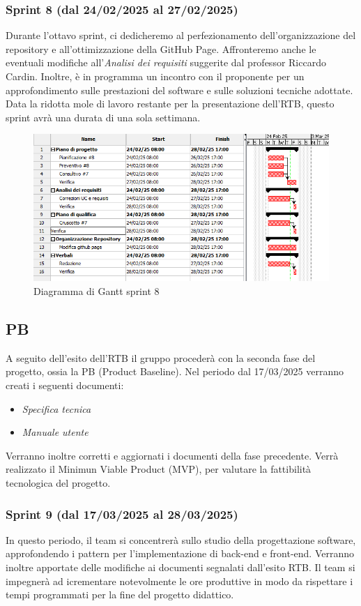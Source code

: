 \subsubsection{Sprint 8 (dal 24/02/2025 al 27/02/2025)}
Durante l'ottavo sprint, ci dedicheremo al perfezionamento dell'organizzazione del repository e all'ottimizzazione della GitHub Page.
Affronteremo anche le eventuali modifiche all'\textit{Analisi dei requisiti} suggerite dal professor Riccardo Cardin.
Inoltre, è in programma un incontro con il proponente per un approfondimento sulle prestazioni del software e sulle soluzioni tecniche adottate.
Data la ridotta mole di lavoro restante per la presentazione dell'RTB, questo sprint avrà una durata di una sola settimana.

\begin{figure}[h!]
    \centering
    \includegraphics[scale = 0.7]{template/images/gantt8.png}
    \caption{Diagramma di Gantt sprint 8}
    \label{fig:3.8} %
\end{figure}

\subsection{PB}
A seguito dell'esito dell'RTB il gruppo procederà con la seconda fase del progetto, ossia la PB (Product Baseline).
Nel periodo dal 17/03/2025 verranno creati i seguenti documenti:
\begin{itemize}
    \item \textit{Specifica tecnica}
    \item \textit{Manuale utente}
\end{itemize}
Verranno inoltre corretti e aggiornati i documenti della fase precedente.
Verrà realizzato il Minimun Viable Product (MVP), per valutare la fattibilità tecnologica del progetto.

\subsubsection{Sprint 9 (dal 17/03/2025 al 28/03/2025)}
In questo periodo, il team si concentrerà sullo studio della progettazione software, approfondendo i pattern per l’implementazione di back-end e front-end.
Verranno inoltre apportate delle modifiche ai documenti segnalati dall'esito RTB.
Il team si impegnerà ad icrementare notevolmente le ore produttive in modo da rispettare i tempi programmati per la fine del progetto didattico.

